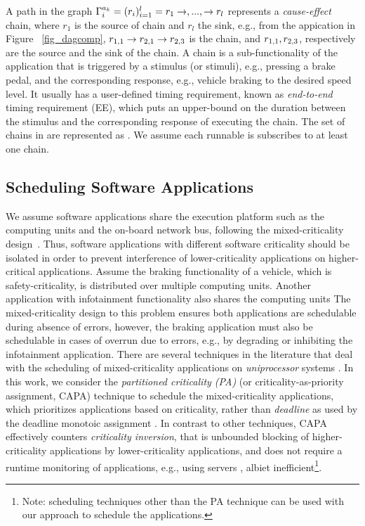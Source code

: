 {A path in the graph $\sss{\Gamma}=(r_i)_{i=1}^l=r_1\rightarrow,...,\rightarrow r_l$ represents a \textit{cause-effect} chain, where $r_1$ is the source of chain and $r_l$ the sink, e.g., from the appication \ttar[1]in Figure~ \ref{fig_dagcomp}, $\ssb{r}[1,1]\rightarrow \ssb{r}[2,1]\rightarrow \ssb{r}[2,3]$ is the chain, and $\ssb{r}[1,1],\ssb{r}[2,3]$, respectively are the source and the sink of the chain. A chain is a sub-functionality of the application that is triggered by a stimulus (or stimuli), e.g., pressing a brake pedal, and the corresponding response, e.g.,  vehicle braking to the desired speed level. It usually has a user-defined timing requirement, known as \textit{end-to-end} timing requirement (EE), which puts an upper-bound on the duration between the stimulus and the corresponding response of executing the chain. The set of chains in \ttar are represented as \sexpsp{\Gamma}{\Gamma}. We assume each runnable is subscribes to at least one chain.

\subsection{Scheduling Software Applications}
We assume software applications share the execution platform such as the computing units and the on-board network bus, following the mixed-criticality design~\cite{Vestal2007PreemptiveAssurance}. Thus, software applications with different software criticality should be isolated in order to prevent interference of lower-criticality applications on higher-critical applications. Assume the braking functionality of a vehicle, which is safety-criticality, is distributed over multiple computing units. Another application with infotainment functionality also shares the computing units The mixed-criticality design to this problem ensures both applications are schedulable during absence of errors, however, the braking application must also be schedulable in cases of overrun due to errors, e.g., by degrading or inhibiting the infotainment application. There are several techniques in the literature that deal with the scheduling of mixed-criticality applications on \textit{uniprocessor} systems \cite{Vestal2007PreemptiveAssurance}. In this work, we consider the \textit{partitioned criticality (PA)} (or criticality-as-priority assignment, CAPA) technique to schedule the mixed-criticality applications, which prioritizes applications based on criticality, rather than \textit{deadline} as used by the deadline monotoic assignment \cite{Baruah2011Response-timeSystems}. In contrast to other techniques, CAPA effectively counters \textit{criticality inversion}, that is unbounded blocking of higher-criticality applications by lower-criticality applications, and does not require a runtime monitoring of applications, e.g., using servers \cite{AbeniIntegratingSystems,Ashjaei2017DesigningSystems,Inam2014ThePlatforms}, albiet inefficient\footnote{Note: scheduling techniques other than the PA technique can be used with our approach to schedule the applications.}. 

}
